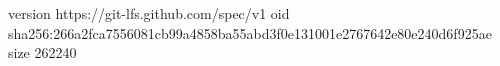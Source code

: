 version https://git-lfs.github.com/spec/v1
oid sha256:266a2fca7556081cb99a4858ba55abd3f0e131001e2767642e80e240d6f925ae
size 262240
